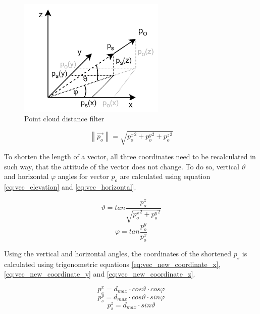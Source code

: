 \begin{figure}[!ht]
    \centering
    \includegraphics[width=70mm, keepaspectratio]{figures/data_distance_filter.png}
    \caption{Point cloud distance filter}
    \label{fig:data_distance_filter}
\end{figure}

\begin{equation} \label{eq:point_length}
    \left\|\vec{p_{o}}\right\| = \sqrt{{p_{o}^{x}}^{2}+{p_{o}^{y}}^{2}+{p_{o}^{z}}^{2}}
\end{equation}

To shorten the length of a vector, all three coordinates need to be recalculated in such way, that the attitude of
the vector does not change. To do so, vertical $\vartheta$ and horizontal $\varphi$ angles for vector $p_{o}$
are calculated using equation \ref{eq:vec_elevation} and \ref{eq:vec_horizontal}.

\begin{equation} \label{eq:vec_elevation}
    \vartheta=tan\frac{p_{o}^{z}}{\sqrt{{p_{o}^{x}}^{2} + {p_{o}^{y}}^{2}}}
\end{equation}
\begin{equation} \label{eq:vec_horizontal}
    \varphi=tan\frac{p_{o}^{y}}{p_{o}^{x}}
\end{equation}

Using the vertical and horizontal angles, the coordinates of the shortened $p_{s}$ is calculated using 
trigonometric equations \ref{eq:vec_new_coordinate_x}, \ref{eq:vec_new_coordinate_y} 
and \ref{eq:vec_new_coordinate_z}.

\begin{equation} \label{eq:vec_new_coordinate_x}
    p_{s}^{x} = d_{max} \cdot cos\vartheta \cdot cos\varphi
\end{equation}
\begin{equation} \label{eq:vec_new_coordinate_y}
    p_{s}^{y} = d_{max} \cdot cos\vartheta \cdot sin\varphi
\end{equation}
\begin{equation} \label{eq:vec_new_coordinate_z}
    p_{s}^{z} = d_{max} \cdot  sin\vartheta
\end{equation}



